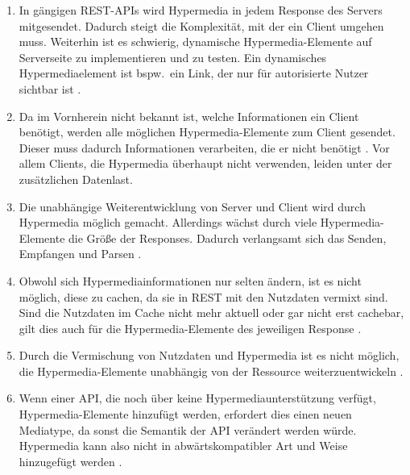 \begin{enumerate}[label=\textbf{P\arabic*}]
    \item\label{itm:intrest|theory|rest-problems|complexity} In gängigen REST-APIs wird Hypermedia in jedem Response des Servers mitgesendet. Dadurch steigt die Komplexität, mit der ein Client umgehen muss. Weiterhin ist es schwierig, dynamische Hypermedia-Elemente auf Serverseite zu implementieren und zu testen. Ein dynamisches Hypermediaelement ist bspw.\ ein Link, der nur für autorisierte Nutzer sichtbar ist \autocite[Abs.~8.2.1]{Vasilakis2017}.

    \item\label{itm:intrest|theory|rest-problems|useless-information} Da im Vornherein nicht bekannt ist, welche Informationen ein Client benötigt, werden alle möglichen Hypermedia-Elemente zum Client gesendet. Dieser muss dadurch Informationen verarbeiten, die er nicht benötigt \autocite[Abs.~8.2.2]{Vasilakis2017}. Vor allem Clients, die Hypermedia überhaupt nicht verwenden, leiden unter der zusätzlichen Datenlast.

    \item\label{itm:intrest|theory|rest-problems|performance-sacrifice} Die unabhängige Weiterentwicklung von Server und Client wird durch Hypermedia möglich gemacht. Allerdings wächst durch viele Hypermedia-Elemente die Größe der Responses. Dadurch verlangsamt sich das Senden, Empfangen und Parsen \autocite[Abs.~8.2.3]{Vasilakis2017}.

    \item\label{itm:intrest|theory|rest-problems|hypermedia-caching} Obwohl sich Hypermediainformationen nur selten ändern, ist es nicht möglich, diese zu cachen, da sie in REST mit den Nutzdaten vermixt sind. Sind die Nutzdaten im Cache nicht mehr aktuell oder gar nicht erst cachebar, gilt dies auch für die Hypermedia-Elemente des jeweiligen Response \autocite[Abs.~8.2.4]{Vasilakis2017}.

    \item\label{itm:intrest|theory|rest-problems|hypermedia-evolvability} Durch die Vermischung von Nutzdaten und Hypermedia ist es nicht möglich, die Hypermedia-Elemente unabhängig von der Ressource weiterzuentwickeln \autocite[Abs.~8.2.5]{Vasilakis2017}.

    \item\label{itm:intrest|theory|rest-problems|backwards-compatibility} Wenn einer API, die noch über keine Hypermediaunterstützung verfügt, Hypermedia-Elemente hinzufügt werden, erfordert dies einen neuen Mediatype, da sonst die Semantik der API verändert werden würde. Hypermedia kann also nicht in abwärtskompatibler Art und Weise hinzugefügt werden \autocite[Abs.~8.2.6.1]{Vasilakis2017}.


\end{enumerate}
